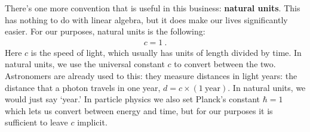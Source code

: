 \documentclass[12pt, oneside]{report}    %
\begin{document}
There's one more convention that is useful in this business: \textbf{natural units}. This has nothing to do with linear algebra, but it does make our lives significantly easier. For our purposes, natural units is the following:
\begin{align}
    c = 1 \ .
\end{align}
Here $c$ is the speed of light, which usually has units of length divided by time. In natural units, we use the universal constant $c$ to convert between the two. Astronomers are already used to this: they measure distances in light years: the distance that a photon travels in one year, $d = c\times(1~\text{year})$. In natural units, we would just say `year.' In particle physics we also set Planck's constant $\hbar = 1$ which lets us convert between energy and time, but for our purposes it is sufficient to leave $c$ implicit. 
\end{document}

